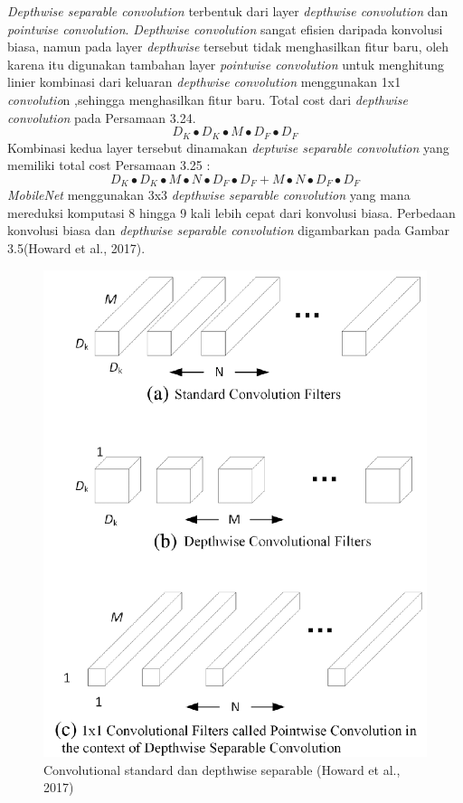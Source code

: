 \emph{Depthwise separable convolution} terbentuk dari layer \emph{depthwise convolution} dan \emph{pointwise convolution}. \emph{Depthwise convolution} sangat efisien daripada konvolusi biasa, namun pada layer \emph{depthwise} tersebut tidak menghasilkan fitur baru, oleh karena itu digunakan tambahan layer \emph{pointwise convolution} untuk menghitung linier kombinasi dari keluaran \emph{depthwise convolution} menggunakan 1x1 \emph{convolutio}n ,sehingga menghasilkan fitur baru. Total cost dari \emph{depthwise convolution} pada Persamaan 3.24.
\begin{equation}
D_K \bullet D_K \bullet M \bullet D_F \bullet D_F
\end{equation}
Kombinasi kedua layer tersebut dinamakan \emph{deptwise separable convolution} yang memiliki total cost Persamaan 3.25 :
\begin{equation}
D_K \bullet D_K \bullet M \bullet N \bullet D_F \bullet D_F + M \bullet N \bullet D_F \bullet D_F
\end{equation}
\emph{MobileNet} menggunakan 3x3 \emph{depthwise separable convolution} yang mana mereduksi komputasi 8 hingga 9 kali lebih cepat dari konvolusi biasa. Perbedaan konvolusi biasa dan \emph{depthwise separable convolution} digambarkan pada Gambar 3.5(Howard et al., 2017).
\begin{figure}[H]
	\centering
	\includegraphics[width=0.5\linewidth]{"new"}
	\caption{Convolutional standard dan depthwise separable (Howard et al., 2017)}
	\label{fig:new}
\end{figure} 
